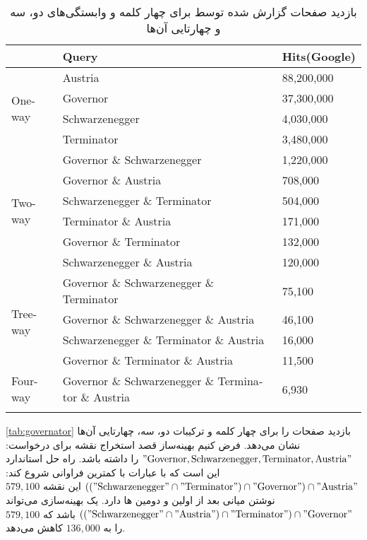 \begin{table}[h]
\centering
\begin{latin}
\begin{tabular}{lll}
\hhline{===}
        		 & Query		& Hits(Google) 	\\ \hline
\multirow{4}{*}{One-way} & Austria  	& 88,200,000 	\\
			 & Governor  	& 37,300,000 	\\
			 & Schwarzenegger & 4,030,000 	\\
			 & Terminator	 & 3,480,000 	\\ \hline
\multirow{6}{*}{Two-way} & Governor \& Schwarzenegger  	& 1,220,000 	\\ 
			 & Governor \& Austria  	& 708,000 	\\
			 & Schwarzenegger \& Terminator & 504,000 	\\
			 & Terminator \& Austria  	& 171,000 	\\
			 & Governor \& Terminator  	& 132,000 	\\
			 & Schwarzenegger \& Austria  	& 120,000 	\\ \hline
\multirow{4}{*}{Tree-way} & Governor \& Schwarzenegger \& Terminator  	& 75,100 \\
			  & Governor \& Schwarzenegger \& Austria  	& 46,100 \\
			  & Schwarzenegger \& Terminator \& Austria 	& 16,000 \\
			  & Governor \& Terminator \& Austria 		& 11,500 \\ \hline
\multirow{1}{*}{Four-way} & Governor \& Schwarzenegger \& Terminator \& Austria & 6,930	\\
\hhline{===}
\end{tabular}
\end{latin}
\caption{
بازدید صفحات گزارش شده توسط 
برای چهار کلمه و وابستگی‌های دو، سه و چهارتایی آن‌ها
}
\label{tab:governator}
\end{table}

\autoref{tab:governator}
بازدید صفحات را برای چهار کلمه و ترکیبات دو، سه، چهارتایی آن‌ها نشان می‌دهد. فرض کنیم بهینه‌ساز قصد استخراج نقشه برای درخواست:
$"\mathrm{Governor, Schwarzenegger, Terminator, Austria}"$
را داشته باشد. راه حل استاندارد این است که با عبارات با کمترین فراوانی شروع کند:
$(("\mathrm{Schwarzenegger}" \cap "\mathrm{Terminator}") \cap "\mathrm{Governor}") \cap "\mathrm{Austria}"$
این نقشه 
$579,100$
نوشتن میانی بعد از اولین و دومین 
ها دارد. یک بهینه‌سازی می‌تواند 
$(("\mathrm{Schwarzenegger}" \cap "\mathrm{Austria}") \cap "\mathrm{Terminator}") \cap "\mathrm{Governor}"$
باشد که 
$579,100$
را به 
$136,000$
کاهش می‌دهد.



